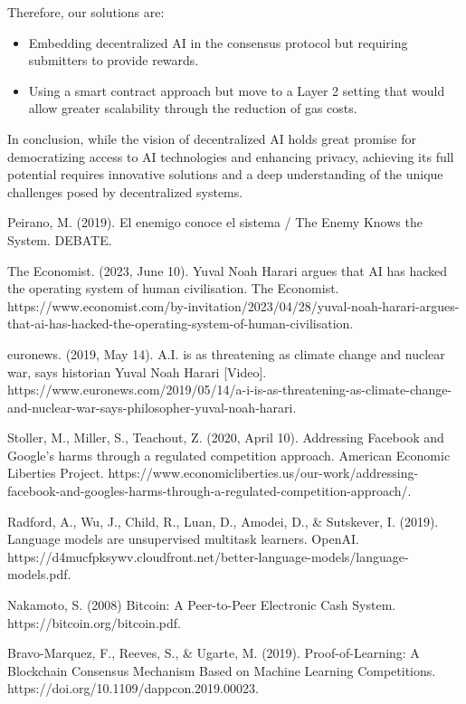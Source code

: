 \documentclass[conference]{IEEEtran}
\begin{document}
Therefore, our solutions are:
\begin{itemize}
\item Embedding decentralized AI in the consensus protocol but requiring submitters to provide rewards.
\item Using a smart contract approach but move to a Layer 2 setting that would allow greater scalability through the reduction of gas costs.
\end{itemize}

In conclusion, while the vision of decentralized AI holds great promise for democratizing access to AI technologies and enhancing privacy, achieving its full potential requires innovative solutions and a deep understanding of the unique challenges posed by decentralized systems.

\begin{thebibliography}{00}

 Peirano, M. (2019). El enemigo conoce el sistema / The Enemy Knows the System. DEBATE.

 The Economist. (2023, June 10). Yuval Noah Harari argues that AI has hacked the operating system of human civilisation. The Economist. https://www.economist.com/by-invitation/2023/04/28/yuval-noah-harari-argues-that-ai-has-hacked-the-operating-system-of-human-civilisation.

 euronews. (2019, May 14). A.I. is as threatening as climate change and nuclear war, says historian Yuval Noah Harari [Video]. https://www.euronews.com/2019/05/14/a-i-is-as-threatening-as-climate-change-and-nuclear-war-says-philosopher-yuval-noah-harari.

 Stoller, M., Miller, S., Teachout, Z. (2020, April 10). Addressing Facebook and Google’s harms through a regulated competition approach. American Economic Liberties Project. https://www.economicliberties.us/our-work/addressing-facebook-and-googles-harms-through-a-regulated-competition-approach/.

 Radford, A., Wu, J., Child, R., Luan, D., Amodei, D., \& Sutskever, I. (2019). Language models are unsupervised multitask learners. OpenAI. https://d4mucfpksywv.cloudfront.net/better-language-models/language-models.pdf.

 Nakamoto, S. (2008) Bitcoin: A Peer-to-Peer Electronic Cash System. https://bitcoin.org/bitcoin.pdf.

 Bravo-Marquez, F., Reeves, S., \& Ugarte, M. (2019). Proof-of-Learning: A Blockchain Consensus Mechanism Based on Machine Learning Competitions. https://doi.org/10.1109/dappcon.2019.00023.


\end{thebibliography}
\end{document}
